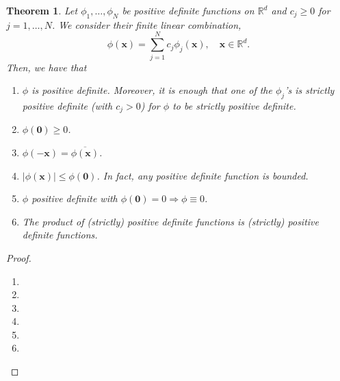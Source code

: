 \documentclass[12pt]{report} %
\newtheorem{theorem}{Theorem}
\newcommand{\tmmathbf}[1]{\ensuremath{\boldsymbol{#1}}}
\begin{document}
\begin{theorem}
  Let $\phi_1, \ldots, \phi_N$ be positive definite functions on
  $\mathbb{R}^d$ and $c_j \geq 0$ for $j = 1, \ldots, N$. We consider their
  finite linear combination,
  \begin{equation}
    \phi (\tmmathbf{x}) = \sum_{j = 1}^N c_j \phi_j (\tmmathbf{x}), \quad
    \tmmathbf{x} \in \mathbb{R}^d . \label{linearcombinationofpsdf}
  \end{equation}
  Then, we have that
  \begin{enumerate}
    \item $\phi$ is positive definite. Moreover, it is enough that one of the
    $\phi_j$'s is strictly positive definite (with $c_j > 0$) for $\phi$ to be
    strictly positive definite.
    
    \item $\phi (\tmmathbf{0}) \geq 0$.
    
    \item \label{propevennes}$\phi (-\tmmathbf{x}) = \overline{\phi
    (\tmmathbf{x})}$.
    
    \item $| \phi (\tmmathbf{x}) | \leq \phi (\tmmathbf{0})$. In fact, any
    positive definite function is bounded.
    
    \item $\phi$ positive definite with $\phi (\tmmathbf{0}) = 0 \Rightarrow
    \phi \equiv 0$.
    
    \item The product of (strictly) positive definite functions is (strictly)
    positive definite functions.
  \end{enumerate}
\end{theorem}

\begin{proof}
  {}
  \begin{enumerate}
    \item
    
    \item
    
    \item
    
    \item
    
    \item
    
    \item 
  \end{enumerate}
\end{proof}
\end{document}
